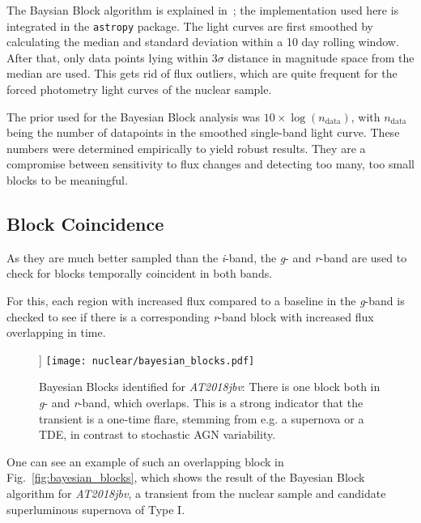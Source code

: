 The Baysian Block algorithm is explained in~; the implementation used here is integrated in the \texttt{astropy} package. The light curves are first smoothed by calculating the median and standard deviation within a 10 day rolling window. After that, only data points lying within $3 \sigma$ distance in magnitude space from the median are used. This gets rid of flux outliers, which are quite frequent for the forced photometry light curves of the nuclear sample.

The prior used for the Bayesian Block analysis was $10 \times \log(n_\text{data})$, with $n_\text{data}$ being the number of datapoints in the smoothed single-band light curve. These numbers were determined empirically to yield robust results. They are a compromise between sensitivity to flux changes and detecting too many, too small blocks to be meaningful.

\subsection{Block Coincidence}
As they are much better sampled than the \textit{i}-band, the \textit{g}- and \textit{r}-band are used to check for blocks temporally coincident in both bands.

For this, each region with increased flux compared to a baseline in the \textit{g}-band is checked to see if there is a corresponding \textit{r}-band block with increased flux overlapping in time.

\begin{figure}]
    \texttt{[image: nuclear/bayesian\_blocks.pdf]}
    \caption[Bayesian Blocks]{Bayesian Blocks identified for \textit{AT2018jbv}: There is one block both in \textit{g}- and \textit{r}-band, which overlaps. This is a strong indicator that the transient is a one-time flare, stemming from e.g. a supernova or a TDE, in contrast to stochastic AGN variability.}
\end{figure}

One can see an example of such an overlapping block in Fig.~\ref{fig:bayesian_blocks}, which shows the result of the Bayesian Block algorithm for \textit{AT2018jbv}, a transient from the nuclear sample and candidate superluminous supernova of Type I.